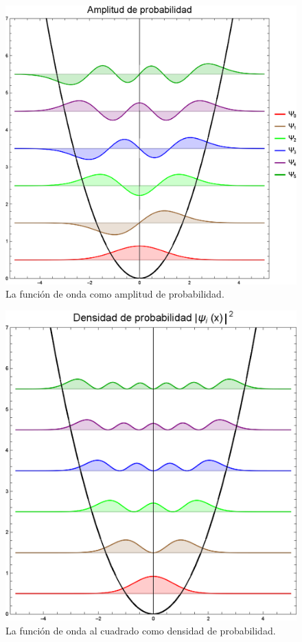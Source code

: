 \begin{figure}[H]
    \centering
    \includegraphics[scale=1]{Imagenes/Plot_Hermite_Oscilador_01_Amplitud.eps}
    \caption{La función de onda como amplitud de probabilidad.}
    \label{fig_figura_funcion_amplitud}
\end{figure}
\begin{figure}[H]
    \centering
    \includegraphics[scale=1]{Imagenes/Plot_Hermite_Oscilador_02_Densidad.eps}
    \caption{La función de onda al cuadrado como densidad de probabilidad.}
    \label{fig_figura_funcion_densidad}
\end{figure}

